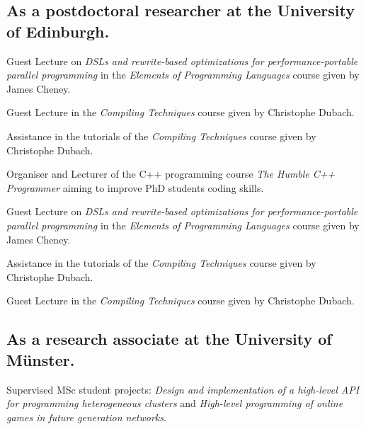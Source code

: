 \subsection{\footnotesize As a postdoctoral researcher at the University of Edinburgh.}

\begin{cvitemize}[\small 2016 - 2017]
    \item Guest Lecture on \emph{\small DSLs and rewrite-based optimizations for performance-portable parallel programming} in the \emph{Elements of Programming Languages} course given by James Cheney.
    \item Guest Lecture in the \emph{Compiling Techniques} course given by Christophe Dubach.
    \item Assistance in the tutorials of the \emph{Compiling Techniques} course given by Christophe Dubach.
\end{cvitemize}

\begin{cvitemize}[\small 2015 - 2016]
    \item Organiser and Lecturer of the C++ programming course \emph{The Humble C++ Programmer} aiming to improve PhD students coding skills.
    \item Guest Lecture on \emph{\small DSLs and rewrite-based optimizations for performance-portable parallel programming} in the \emph{Elements of Programming Languages} course given by James Cheney.
    \item Assistance in the tutorials of the \emph{Compiling Techniques} course given by Christophe Dubach.
\end{cvitemize}

\begin{cvitemize}[\small 2014 - 2015]
    \item Guest Lecture in the \emph{Compiling Techniques} course given by Christophe Dubach.
\end{cvitemize}

\subsection{\footnotesize As a research associate at the University of M{\"u}nster.}

\begin{cvitemize}[\small 2013 - 2014]
  \item Supervised MSc student projects:
        \emph{Design and implementation of a high-level API for programming heterogeneous clusters} and \emph{High-level programming of online games in future generation networks}.
\end{cvitemize}

